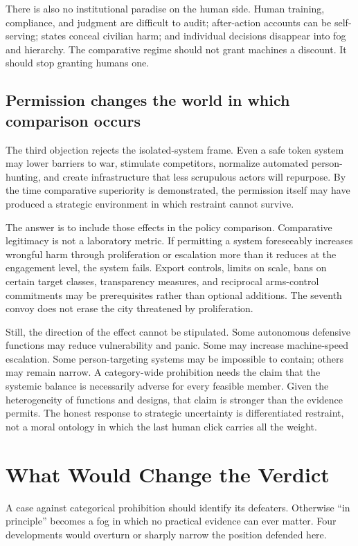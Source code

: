 \documentclass[11pt]{article}
\begin{document}
There is also no institutional paradise on the human side. Human training, compliance, and judgment are difficult to audit; after-action accounts can be self-serving; states conceal civilian harm; and individual decisions disappear into fog and hierarchy. The comparative regime should not grant machines a discount. It should stop granting humans one.

\subsection{Permission changes the world in which comparison occurs}

The third objection rejects the isolated-system frame. Even a safe token system may lower barriers to war, stimulate competitors, normalize automated person-hunting, and create infrastructure that less scrupulous actors will repurpose. By the time comparative superiority is demonstrated, the permission itself may have produced a strategic environment in which restraint cannot survive.

The answer is to include those effects in the policy comparison. Comparative legitimacy is not a laboratory metric. If permitting a system foreseeably increases wrongful harm through proliferation or escalation more than it reduces at the engagement level, the system fails. Export controls, limits on scale, bans on certain target classes, transparency measures, and reciprocal arms-control commitments may be prerequisites rather than optional additions. The seventh convoy does not erase the city threatened by proliferation.

Still, the direction of the effect cannot be stipulated. Some autonomous defensive functions may reduce vulnerability and panic. Some may increase machine-speed escalation. Some person-targeting systems may be impossible to contain; others may remain narrow. A category-wide prohibition needs the claim that the systemic balance is necessarily adverse for every feasible member. Given the heterogeneity of functions and designs, that claim is stronger than the evidence permits. The honest response to strategic uncertainty is differentiated restraint, not a moral ontology in which the last human click carries all the weight.

\section{What Would Change the Verdict}
\label{sec:change}

A case against categorical prohibition should identify its defeaters. Otherwise ``in principle'' becomes a fog in which no practical evidence can ever matter. Four developments would overturn or sharply narrow the position defended here.
\end{document}
